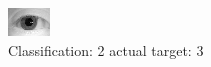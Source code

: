 \begin{figure}[h!]
\begin{center}
\includegraphics[width=0.60\columnwidth]{figures/ID1156_class_2_target_3.png}
\end{center}
\caption{ Classification: 2 actual target: 3}
\label{fig:ID1156_class_2_target_3}
\end{figure}
